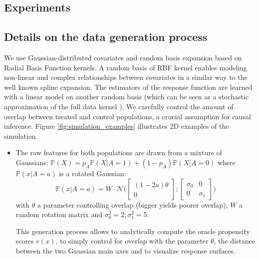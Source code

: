 \documentclass[unnumsec,webpdf,contemporary,large]{oup-authoring-template}%
\theoremstyle{thmstyleone}%
\theoremstyle{thmstyletwo}%
\theoremstyle{thmstylethree}%
\begin{document}
\begin{appendices}
    \section{Experiments}

    \subsection{Details on the data generation process}
    \label{apd:experiments:generation}

    We use Gaussian-distributed covariates and random basis expansion based on
    Radial Basis Function kernels. A random basis of RBF kernel enables modeling
    non-linear and complex relationships between covariates in a similar way to the
    well known spline expansion. The estimators of the response function are learned
    with a linear model on another random basis (which can be seen as a stochastic
    approximation of the full data kernel \cite{rahimi_random_2008}). We carefully
    control the amount of overlap between treated and control populations, a crucial
    assumption for causal inference. Figure \ref{fig:simulation_examples}
    illustrates 2D examples of the simulation.

    \begin{itemize}
        \item The raw features for both populations are drawn from a mixture of
              Gaussians:
              $\mathbb P(X) = p_A \mathbb P(X|A=1) + (1- p_A) \mathbb P(X|A=0)$
              where $\mathbb P(x|A=a)$ is a rotated Gaussian:
              \begin{equation}
                  \mathbb P(x|A=a) = W \cdot \mathcal N \Big( \begin{bmatrix} (1-2a) \theta \\ 0\end{bmatrix} ; \begin{bmatrix} \sigma_0 & 0 \\ 0 & \sigma_1\end{bmatrix} \Big)
              \end{equation}
              with $\theta$ a parameter controlling overlap (bigger yields poorer
              overlap), $W$ a random rotation matrix and $\sigma_0^2=2;\sigma_1^2=5$.

              This generation process allows to analytically compute the oracle
              propensity scores $e(x)$, to simply control for overlap with the
              parameter $\theta$, the distance between the two Gaussian main axes and
              to  visualize response surfaces.


\end{itemize}
\end{appendices}
\end{document}
